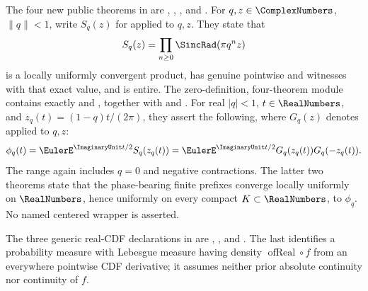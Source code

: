 \documentclass[11pt]{article}
\numberwithin{equation}{section}
\theoremstyle{definition}
\theoremstyle{remark}
\begin{document}
The four new public theorems in  are
,
,
, and
.  For \(q,z\in\ComplexNumbers\), \(\lVert q\rVert<1\), write
\(S_q(z)\) for  applied to \(q,z\).  They state that
\[
 S_q(z)=\prod_{n\ge0}\SincRad(\pi q^nz)
\]
is a locally uniformly convergent product, has genuine pointwise  and
 witnesses with that exact value, and is entire.  The zero-definition,
four-theorem module  contains exactly
 and
, together
with  and
.  For real
\(|q|<1\), \(t\in\RealNumbers\), and \(z_q(t)=(1-q)t/(2\pi)\), they assert the following, where
\(G_q(z)\) denotes  applied to \(q,z\):
\[
 \phi_q(t)=\EulerE^{\ImaginaryUnit t/2}S_q(z_q(t))
 =\EulerE^{\ImaginaryUnit t/2}G_q(z_q(t))G_q(-z_q(t)).
\]
The range again includes \(q=0\) and negative contractions.  The latter two theorems state
that the phase-bearing finite prefixes converge locally uniformly on \(\RealNumbers\), hence uniformly
on every compact \(K\subset\RealNumbers\), to \(\phi_q\).  No named centered wrapper is asserted.

The three generic real-CDF declarations in  are
,
, and
.  The last identifies a probability
measure with Lebesgue measure having density \(\operatorname{ofReal}\circ f\) from an
everywhere pointwise CDF derivative; it assumes neither prior absolute continuity nor
continuity of \(f\).
\end{document}
